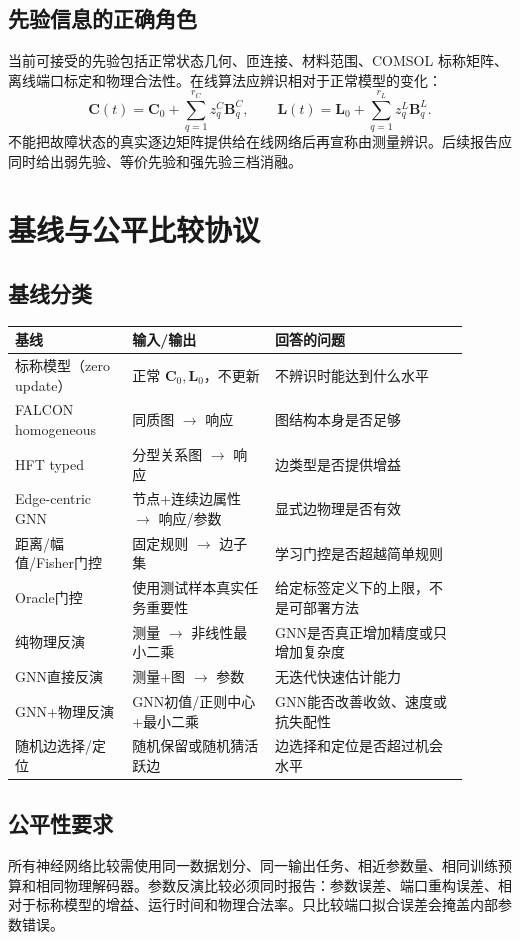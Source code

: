 \documentclass[UTF8,11pt,a4paper]{ctexart}
\newcommand{\mat}[1]{\bm{#1}}
\begin{document}
\subsection{先验信息的正确角色}
当前可接受的先验包括正常状态几何、匝连接、材料范围、COMSOL 标称矩阵、离线端口标定和物理合法性。在线算法应辨识相对于正常模型的变化：
\begin{equation}
\mat C(t)=\mat C_0+\sum_{q=1}^{r_C}z_q^C\mat B_q^C,
\qquad
\mat L(t)=\mat L_0+\sum_{q=1}^{r_L}z_q^L\mat B_q^L.
\end{equation}
不能把故障状态的真实逐边矩阵提供给在线网络后再宣称由测量辨识。后续报告应同时给出弱先验、等价先验和强先验三档消融。

\section{基线与公平比较协议}

\subsection{基线分类}
\begin{longtable}{p{0.23\linewidth}p{0.29\linewidth}p{0.38\linewidth}}
\toprule
基线 & 输入/输出 & 回答的问题\\
\midrule
标称模型（zero update） & 正常 $\mat C_0,\mat L_0$，不更新 & 不辨识时能达到什么水平\\
FALCON homogeneous & 同质图 $\rightarrow$ 响应 & 图结构本身是否足够\\
HFT typed & 分型关系图 $\rightarrow$ 响应 & 边类型是否提供增益\\
Edge-centric GNN & 节点+连续边属性 $\rightarrow$ 响应/参数 & 显式边物理是否有效\\
距离/幅值/Fisher门控 & 固定规则 $\rightarrow$ 边子集 & 学习门控是否超越简单规则\\
Oracle门控 & 使用测试样本真实任务重要性 & 给定标签定义下的上限，不是可部署方法\\
纯物理反演 & 测量 $\rightarrow$ 非线性最小二乘 & GNN是否真正增加精度或只增加复杂度\\
GNN直接反演 & 测量+图 $\rightarrow$ 参数 & 无迭代快速估计能力\\
GNN+物理反演 & GNN初值/正则中心+最小二乘 & GNN能否改善收敛、速度或抗失配性\\
随机边选择/定位 & 随机保留或随机猜活跃边 & 边选择和定位是否超过机会水平\\
\bottomrule
\end{longtable}

\subsection{公平性要求}
所有神经网络比较需使用同一数据划分、同一输出任务、相近参数量、相同训练预算和相同物理解码器。参数反演比较必须同时报告：参数误差、端口重构误差、相对于标称模型的增益、运行时间和物理合法率。只比较端口拟合误差会掩盖内部参数错误。
\end{document}
